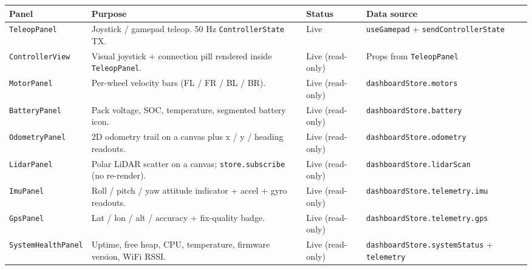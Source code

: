 \begin{center}
\begin{tabular}{|p{2.6cm}|p{4.7cm}|p{2.6cm}|p{4.0cm}|}
\hline
\textbf{Panel}            & \textbf{Purpose}                                                            & \textbf{Status}             & \textbf{Data source}                                                       \\
\hline
\texttt{TeleopPanel}      & Joystick / gamepad teleop. 50 Hz \texttt{ControllerState} TX.               & Live                        & \texttt{useGamepad} + \texttt{sendControllerState}                          \\
\texttt{ControllerView}   & Visual joystick + connection pill rendered inside \texttt{TeleopPanel}.    & Live (read-only)            & Props from \texttt{TeleopPanel}                                            \\
\texttt{MotorPanel}       & Per-wheel velocity bars (FL / FR / BL / BR).                                & Live (read-only)            & \texttt{dashboardStore.motors}                                              \\
\texttt{BatteryPanel}     & Pack voltage, SOC, temperature, segmented battery icon.                     & Live (read-only)            & \texttt{dashboardStore.battery}                                             \\
\texttt{OdometryPanel}    & 2D odometry trail on a canvas plus x / y / heading readouts.                & Live (read-only)            & \texttt{dashboardStore.odometry}                                            \\
\texttt{LidarPanel}       & Polar LiDAR scatter on a canvas; \texttt{store.subscribe} (no re-render).   & Live (read-only)            & \texttt{dashboardStore.lidarScan}                                            \\
\texttt{ImuPanel}         & Roll / pitch / yaw attitude indicator + accel + gyro readouts.              & Live (read-only)            & \texttt{dashboardStore.telemetry.imu}                                       \\
\texttt{GpsPanel}         & Lat / lon / alt / accuracy + fix-quality badge.                             & Live (read-only)            & \texttt{dashboardStore.telemetry.gps}                                       \\
\texttt{SystemHealthPanel}& Uptime, free heap, CPU, temperature, firmware version, WiFi RSSI.           & Live (read-only)            & \texttt{dashboardStore.systemStatus} + \texttt{telemetry}                   \\

\end{tabular}
\end{center}
